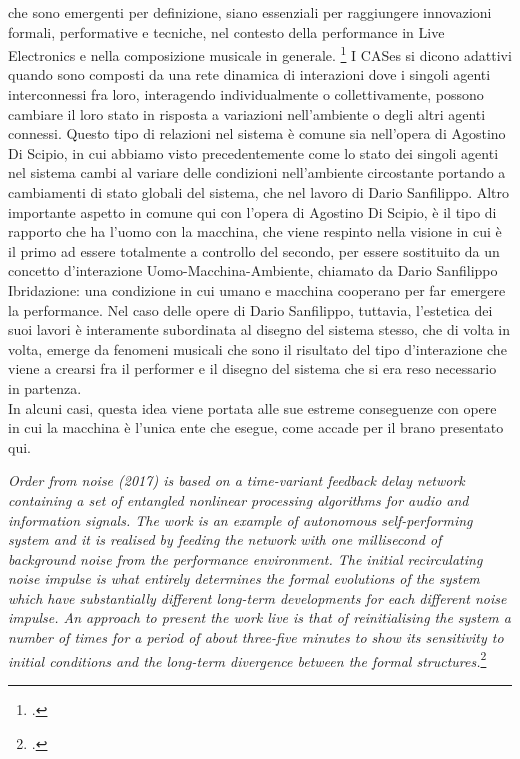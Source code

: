 che sono emergenti per definizione, siano essenziali per raggiungere innovazioni formali, 
performative e tecniche, nel contesto della performance in Live Electronics e nella composizione musicale in generale. 
\footcite{sanfilippo_time-variant_2018}
I CASes si dicono adattivi quando sono composti da una rete dinamica 
di interazioni dove i singoli agenti interconnessi fra loro, interagendo individualmente
o collettivamente, possono cambiare il loro stato in risposta a variazioni nell'ambiente o
degli altri agenti connessi. 
Questo tipo di relazioni nel sistema è comune sia nell'opera di Agostino Di Scipio,
in cui abbiamo visto precedentemente come lo stato dei singoli agenti nel sistema 
cambi al variare delle condizioni nell'ambiente circostante portando a
cambiamenti di stato globali del sistema, che nel lavoro di Dario Sanfilippo.
Altro importante aspetto in comune qui con l'opera di Agostino Di Scipio,
è il tipo di rapporto che ha l'uomo con la macchina, che viene respinto nella visione in cui è il primo
ad essere totalmente a controllo del secondo, per essere sostituito da un concetto 
d'interazione Uomo-Macchina-Ambiente, chiamato da Dario Sanfilippo Ibridazione: 
una condizione in cui umano e macchina cooperano per far emergere la performance. 
Nel caso delle opere di Dario Sanfilippo, tuttavia, l'estetica dei suoi lavori è interamente subordinata
al disegno del sistema stesso, che di volta in volta, emerge da fenomeni musicali che sono il risultato
del tipo d'interazione che viene a crearsi fra il performer e il disegno del sistema che si era reso necessario
in partenza. \\
In alcuni casi, questa idea viene portata alle sue estreme conseguenze con opere in cui la macchina è l'unica 
ente che esegue, come accade per il brano presentato qui.

\begin{center}
    \vspace{0.5cm}
    \textit{Order from noise (2017) is based on a time-variant feedback delay network containing a 
    set of entangled nonlinear processing algorithms for audio and information signals. 
    The work is an example of autonomous self-performing system and it is realised by
    feeding the network with one millisecond of background noise from the performance
    environment. The initial recirculating noise impulse is what entirely determines the
    formal evolutions of the system which have substantially different long-term developments 
    for each different noise impulse. An approach to present the work live is that
    of reinitialising the system a number of times for a period of about three-five minutes
    to show its sensitivity to initial conditions and the long-term divergence between the
    formal structures.}\footcite{sanfilippo_time-variant_2018}
    \vspace{0.5cm}
\end{center}

